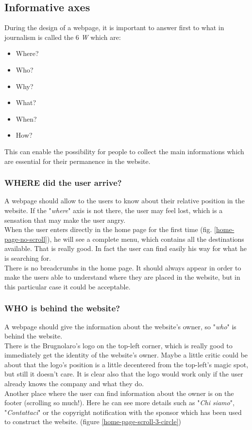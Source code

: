 \subsection{Informative axes}
During the design of a webpage, it is important to answer first
to what in journalism is called the 6 \textit{W} which are:
\begin{itemize}
    \item Where?
    \item Who?
    \item Why?
    \item What?
    \item When?
    \item How?
\end{itemize}
This can enable the possibility for people to collect the main informations which are
essential for their permanence in the website.
\subsubsection{WHERE did the user arrive?}
A webpage should allow to the users to know about their relative position
in the website. If the "\textit{where}" axis is not there,
the user may feel lost, which is a sensation that may make the user angry.\\

When the user enters directly in the home page for the first time (fig. \ref{home-page-no-scroll}), he will see a
complete menu, which contains all the destinations available. That is
really good. In fact the user can find easily his way for what he is searching for.\\
There is no breadcrumbs in the home page. It should always appear in order
to make the users able to understand where they are placed in the website, but in this
particular case it could be acceptable.

\subsubsection{WHO is behind the website?}
A webpage should give the information about the website's owner, so "\textit{who}" is
behind the website.\\

There is the Brugnolaro's logo on the top-left corner, which is really good to immediately get the
identity of the website's owner. Maybe a little critic could be about that the logo's position
is a little decentered from the top-left's magic spot, but still it doesn't care. It is clear
also that the logo would work only if the user already knows the company and what they do.\\
Another place where the user can find information about the owner is on the footer (scrolling
so much!). Here he can see more details such as "\textit{Chi siamo}", "\textit{Contattaci}" or
the copyright notification with the sponsor which has been used to construct the website.
(figure \ref{home-page-scroll-3-circle})

